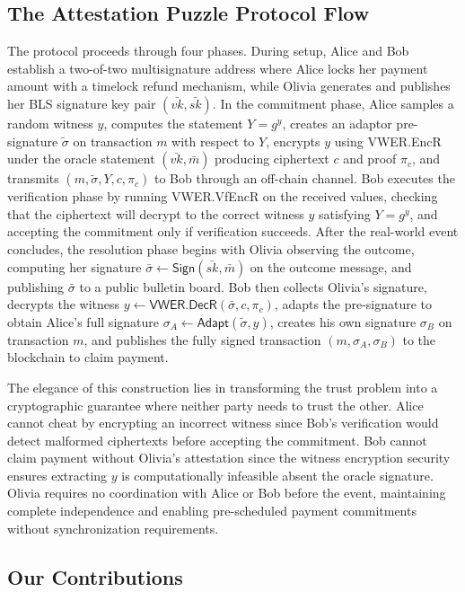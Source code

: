 \documentclass[11pt,a4paper]{article}
\newcommand{\Sign}{\textsf{Sign}}
\begin{document}
{\subsection{The Attestation Puzzle Protocol Flow}

The protocol proceeds through four phases. During setup, Alice and Bob establish a two-of-two multisignature address where Alice locks her payment amount with a timelock refund mechanism, while Olivia generates and publishes her BLS signature key pair $(\bar{vk}, \bar{sk})$. In the commitment phase, Alice samples a random witness $y$, computes the statement $Y = g^y$, creates an adaptor pre-signature $\tilde{\sigma}$ on transaction $m$ with respect to $Y$, encrypts $y$ using VWER.EncR under the oracle statement $(\bar{vk}, \bar{m})$ producing ciphertext $c$ and proof $\pi_c$, and transmits $(m, \tilde{\sigma}, Y, c, \pi_c)$ to Bob through an off-chain channel. Bob executes the verification phase by running VWER.VfEncR on the received values, checking that the ciphertext will decrypt to the correct witness $y$ satisfying $Y = g^y$, and accepting the commitment only if verification succeeds. After the real-world event concludes, the resolution phase begins with Olivia observing the outcome, computing her signature $\bar{\sigma} \leftarrow \Sign(\bar{sk}, \bar{m})$ on the outcome message, and publishing $\bar{\sigma}$ to a public bulletin board. Bob then collects Olivia's signature, decrypts the witness $y \leftarrow \textsf{VWER.DecR}(\bar{\sigma}, c, \pi_c)$, adapts the pre-signature to obtain Alice's full signature $\sigma_A \leftarrow \textsf{Adapt}(\tilde{\sigma}, y)$, creates his own signature $\sigma_B$ on transaction $m$, and publishes the fully signed transaction $(m, \sigma_A, \sigma_B)$ to the blockchain to claim payment.

The elegance of this construction lies in transforming the trust problem into a cryptographic guarantee where neither party needs to trust the other. Alice cannot cheat by encrypting an incorrect witness since Bob's verification would detect malformed ciphertexts before accepting the commitment. Bob cannot claim payment without Olivia's attestation since the witness encryption security ensures extracting $y$ is computationally infeasible absent the oracle signature. Olivia requires no coordination with Alice or Bob before the event, maintaining complete independence and enabling pre-scheduled payment commitments without synchronization requirements.

\subsection{Our Contributions}

}
\end{document}
